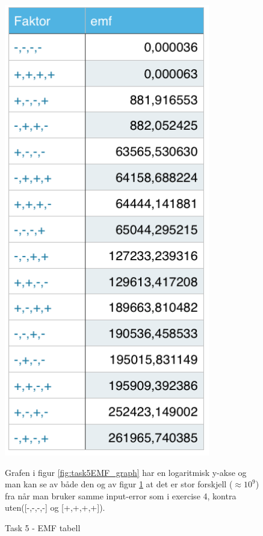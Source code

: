 	\begin{figure}[h]
		\begin{minipage}{.5\textwidth}
			\centering
			\includegraphics[width=0.8\textwidth]{sections/Exercise5/emf.png}
				\caption{Task 5 - EMF tabell}
				\label{fig:task5EMF}
		\end{minipage}
		\vspace{20 mm}
		\begin{minipage}{.5\textwidth}
			Grafen i figur \ref{fig:task5EMF_graph} har en logaritmisk y-akse og man kan se av både den og av figur \ref{fig:task5EMF} at det er stor forskjell ($\approx10^9$) fra når man bruker samme input-error som i exercise 4, kontra uten([-,-,-,-] og [+,+,+,+]).
		\end{minipage}


\end{figure}
